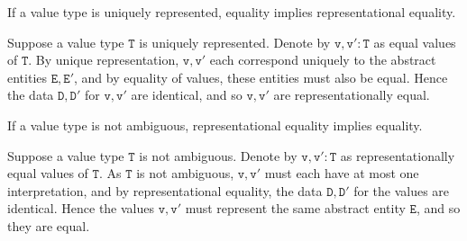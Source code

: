 \begin{Lemma}
    If a value type is uniquely represented, equality implies representational equality.
\end{Lemma}

\begin{solution}
    Suppose a value type $\mathtt{T}$ is uniquely represented. Denote by $\mathtt{v, v' : T}$ 
    as equal values of $\mathtt{T}$. By unique representation, 
    $\mathtt{v}, \mathtt{v'}$ each correspond uniquely to the abstract entities $\mathtt{E, E'}$, 
    and by equality of values, these entities must also be equal. Hence the data $\mathtt{D, D'}$ 
    for $\mathtt{v, v'}$ are identical, and so $\mathtt{v, v'}$ are representationally equal.
\end{solution}

\begin{Lemma}
    If a value type is not ambiguous, representational equality implies equality.
\end{Lemma}

\begin{solution}
    Suppose a value type $\mathtt{T}$ is not ambiguous. Denote by $\mathtt{v, v' : T}$ as 
    representationally equal values of $\mathtt{T}$. As $\mathtt{T}$ is not 
    ambiguous, $\mathtt{v, v'}$ must each have at most one interpretation, and 
    by representational equality, the data $\mathtt{D, D'}$ for the values are 
    identical. Hence the values $\mathtt{v, v'}$ must represent the same abstract 
    entity $\mathtt{E}$, and so they are equal.
\end{solution}